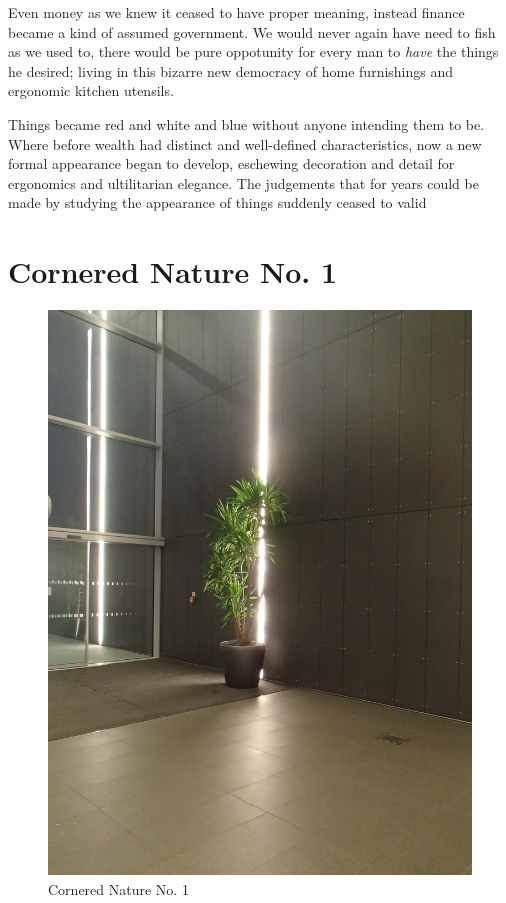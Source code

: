 \documentclass{book}
\begin{document}
Even money as we knew it ceased to have proper meaning, instead finance became
a kind of assumed government. We would never again have need to fish as we used
to, there would be pure oppotunity for every man to \emph{have} the things he
desired; living in this bizarre new democracy of home furnishings and ergonomic
kitchen utensils.

Things became red and white and blue without anyone intending them to be. Where
before wealth had distinct and well-defined characteristics, now a new formal
appearance began to develop, eschewing decoration and detail for ergonomics and
ultilitarian elegance. The judgements that for years could be made by studying
the appearance of things suddenly ceased to valid

\chapter{Cornered Nature No. 1}

\begin{figure}
\centering
\includegraphics[width=\textwidth,angle=-90]{figures/P1050156.JPG}
\caption{Cornered Nature No. 1}
\end{figure}
\end{document}

